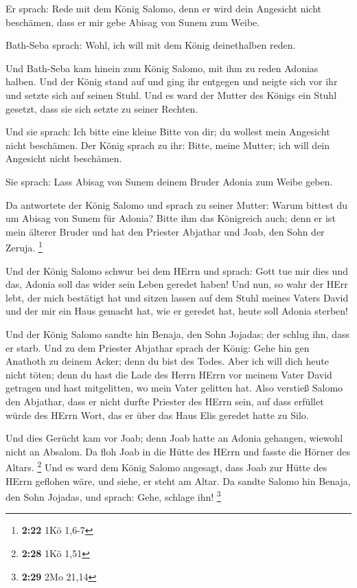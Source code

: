  Er sprach: Rede mit dem König Salomo, denn er wird dein
Angesicht nicht beschämen, dass er mir gebe Abisag von Sunem zum Weibe.

 Bath-Seba sprach: Wohl, ich will mit dem König
deinethalben reden.

 Und Bath-Seba kam hinein zum König Salomo, mit ihm zu
reden Adonias halben. Und der König stand auf und ging ihr entgegen und
neigte sich vor ihr und setzte sich auf seinen Stuhl. Und es ward der
Mutter des Königs ein Stuhl gesetzt, dass sie sich setzte zu seiner
Rechten.

 Und sie sprach: Ich bitte eine kleine Bitte von dir; du
wollest mein Angesicht nicht beschämen. Der König sprach zu ihr: Bitte,
meine Mutter; ich will dein Angesicht nicht beschämen.

 Sie sprach: Lass Abisag von Sunem deinem Bruder Adonia zum
Weibe geben.

 Da antwortete der König Salomo und sprach zu seiner
Mutter: Warum bittest du um Abisag von Sunem für Adonia? Bitte ihm das
Königreich auch; denn er ist mein älterer Bruder und hat den Priester
Abjathar und Joab, den Sohn der Zeruja. \footnote{\textbf{2:22} 1Kö
  1,6-7}

 Und der König Salomo schwur bei dem HErrn und sprach: Gott
tue mir dies und das, Adonia soll das wider sein Leben geredet haben!
 Und nun, so wahr der HErr lebt, der mich bestätigt hat und
sitzen lassen auf dem Stuhl meines Vaters David und der mir ein Haus
gemacht hat, wie er geredet hat, heute soll Adonia sterben!

 Und der König Salomo sandte hin Benaja, den Sohn Jojadas;
der schlug ihn, dass er starb.  Und zu dem Priester
Abjathar sprach der König: Gehe hin gen Anathoth zu deinem Acker; denn
du bist des Todes. Aber ich will dich heute nicht töten; denn du hast
die Lade des Herrn HErrn vor meinem Vater David getragen und hast
mitgelitten, wo mein Vater gelitten hat.  Also verstieß
Salomo den Abjathar, dass er nicht durfte Priester des HErrn sein, auf
dass erfüllet würde des HErrn Wort, das er über das Haus Elis geredet
hatte zu Silo.

 Und dies Gerücht kam vor Joab; denn Joab hatte an Adonia
gehangen, wiewohl nicht an Absalom. Da floh Joab in die Hütte des HErrn
und fasste die Hörner des Altars. \footnote{\textbf{2:28} 1Kö 1,51}
 Und es ward dem König Salomo angesagt, dass Joab zur Hütte
des HErrn geflohen wäre, und siehe, er steht am Altar. Da sandte Salomo
hin Benaja, den Sohn Jojadas, und sprach: Gehe, schlage ihn! \footnote{\textbf{2:29}
  2Mo 21,14}

